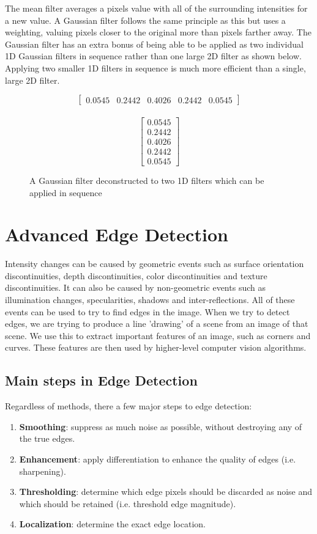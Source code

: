 \documentclass{article}
\begin{document}
	The mean filter averages a pixels value with all of the surrounding intensities for a new value. A Gaussian filter follows the same principle as this but uses a weighting, valuing pixels closer to the original more than pixels farther away.	The Gaussian filter has an extra bonus of being able to be applied as two individual 1D Gaussian filters in sequence rather than one large 2D filter as shown below. Applying two smaller 1D filters in sequence is much more efficient than a single, large 2D filter.
	\begin{figure}[ht]
	\begin{multicols}{2}
		\[\begin{bmatrix} 0.0545 & 0.2442 & 0.4026 & 0.2442 & 0.0545 \end{bmatrix} \] \\
		\[\begin{bmatrix} 0.0545 \\ 0.2442 \\ 0.4026 \\ 0.2442 \\ 0.0545 \end{bmatrix} \]
	\end{multicols}
	\caption{A Gaussian filter deconstructed to two 1D filters which can be applied in sequence}
	\label{fig:1d gaussian filter}
	\end{figure}
	
	\section{Advanced Edge Detection}
	Intensity changes can be caused by geometric events such as surface orientation discontinuities, depth discontinuities, color discontinuities and texture discontinuities. It can also be caused by non-geometric events such as illumination changes, specularities, shadows and inter-reflections. All of these events can be used to try to find edges in the image. When we try to detect edges, we are trying to produce a line 'drawing' of a scene from an image of that scene. We use this to extract important features of an image, such as corners and curves. These features are then used by higher-level computer vision algorithms.
	
	\subsection{Main steps in Edge Detection}
	Regardless of methods, there a few major steps to edge detection:
		\begin{enumerate}
			\item \textbf{Smoothing}: suppress as much noise as possible, without destroying any of the true edges.
			\item \textbf{Enhancement}: apply differentiation to enhance the quality of edges (i.e. sharpening).
			\item \textbf{Thresholding}: determine which edge pixels should be discarded as  noise and which should be retained (i.e. threshold edge magnitude).
			
			\item \textbf{Localization}: determine the exact edge location.
		\end{enumerate}
\end{document}
